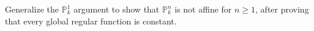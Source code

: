 \begin{problem}\label{chal:vi18-c02}
Generalize the $\mathbb P^1_k$ argument to show that $\mathbb P^n_k$ is not affine for $n\ge1$, after proving that every global regular function is constant.
\end{problem}
